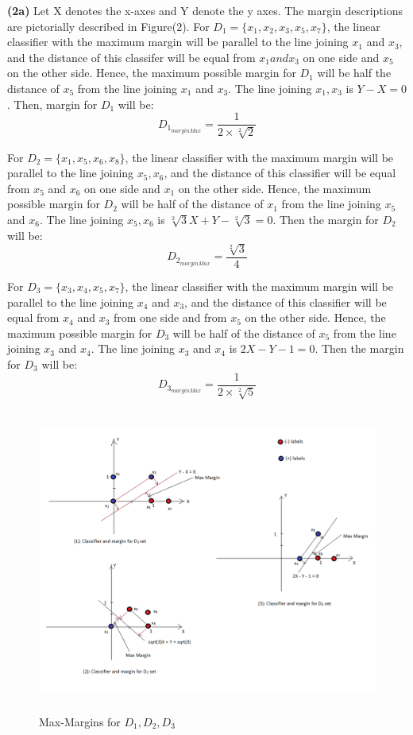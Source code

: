 \documentclass{article}
\renewcommand\part[1]{\vspace{.10in}\textbf{(#1)}}
\begin{document}
  \part{2a} Let X denotes the x-axes and Y denote the y axes. \newline
  The margin descriptions are pictorially described in Figure(2). \newline
  For $D_1 = \{x_1, x_2, x_3, x_5, x_7\}$, the linear classifier with the maximum margin will be parallel to the line joining $x_1$ and $x_3$, and the distance of this classifer will be equal from $x_1 and x_3$ on one side and $x_5$ on the other side.  Hence, the maximum possible margin for $D_1$ will be half the distance of $x_5$ from the line joining $x_1$ and $x_3$. The line joining $x_1,x_3$ is $Y - X = 0$. Then, margin for $D_1$ will be: \newline
  \[D_{1_{marginMax}} = \dfrac{1}{2 \times \sqrt[2]{2}}\]
 
    For $D_2 = \{ x_1, x_5, x_6, x_8\}$, the linear classifier with the maximum margin will be parallel to the line joining $x_5, x_6$, and the distance of this classifier will be equal from $x_5$ and $x_6$ on one side and $x_1$ on the other side. Hence, the maximum possible margin for $D_2$ will be half of the distance of $x_1$ from the line joining $x_5$ and $x_6$. The line joining $x_5, x_6$ is $\sqrt[2]{3}X + Y - \sqrt[2]{3} = 0$. Then the margin for $D_2$ will be: \newline
    \[D_{2_{marginMax}} = \dfrac{\sqrt[2]{3}}{4} \]

    For $D_3 = \{ x_3, x_4, x_5, x_7 \}$, the linear classifier with the maximum margin will be parallel to the line joining $x_4$ and $x_3$, and the distance of this classifier will be equal from $x_4$ and $x_3$ from one side and from $x_5$ on the other side. Hence, the maximum possible margin for $D_3$ will be half of the distance of $x_5$ from the line joining $x_3$ and $x_4$. The line joining $x_3$ and $x_4$ is $2X - Y - 1 = 0$. Then the margin for $D_3$ will be: \newline
    \[ D_{3_{marginMax}} = \dfrac{1}{2\times \sqrt[2]{5}}\]
   \begin{figure}[H]
   \centering
  \includegraphics[width=14cm, height=10cm]{Prob1pt2}
  \caption{Max-Margins for $D_1, D_2, D_3$}
  \end{figure}
\end{document}
